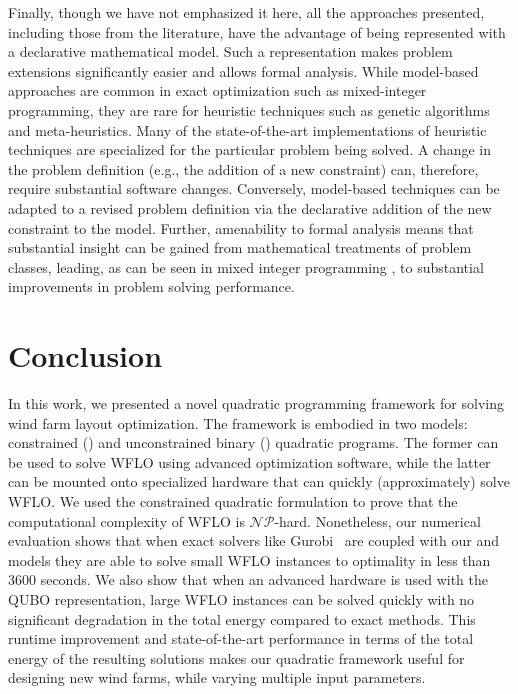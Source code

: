 \documentclass[preprint,12pt]{elsarticle}
\newcommand{\qcls}{{\sf {\small QC-LS\xspace}}}
\newcommand{\quls}{{\sf {\small QU-LS\xspace}}}
\begin{document}
Finally, though we have not emphasized it here, all the approaches presented, including those from the literature, have the advantage of being represented with a declarative mathematical model. Such a representation makes problem extensions significantly easier and allows formal analysis. While model-based  approaches are common in exact optimization such as mixed-integer programming, they are rare for heuristic techniques such as genetic algorithms and meta-heuristics. Many of the state-of-the-art implementations of heuristic techniques are specialized for the particular problem being solved. A change in the problem definition (e.g., the addition of a new constraint) can, therefore, require substantial software changes. Conversely, model-based techniques can be adapted to a revised problem definition via the declarative addition of the new constraint to the model. Further, amenability to formal analysis means that substantial insight can be gained from mathematical treatments of problem classes, leading, as can be seen in mixed integer programming \cite{Bixby07a}, to substantial improvements in problem solving performance.


  
\section{Conclusion}
\label{sec:conclusion}

In this work, we presented a novel quadratic programming framework
for solving 
wind farm layout optimization. 
The framework is embodied in two models: constrained (\qcls) and unconstrained binary
 (\quls) quadratic programs. The former can be used to solve WFLO using advanced optimization software,
while the latter can be mounted onto specialized hardware that can quickly (approximately) solve WFLO. We used the constrained quadratic formulation to prove 
that the computational complexity of WFLO is $\mathcal{NP}$-hard. Nonetheless,
our numerical evaluation shows that when exact solvers like Gurobi~\cite{gurobi} are
coupled with our \qcls{} and \quls{} models they are able to solve small WFLO instances to optimality in less than 3600 seconds.
We also show that when an advanced hardware is used with the QUBO representation, large WFLO instances can be solved quickly with no significant degradation in the total energy compared to exact methods.
This runtime improvement and state-of-the-art performance in terms of the total energy of the resulting solutions makes our quadratic framework useful for designing new wind farms, while varying multiple input parameters. 
\end{document}
